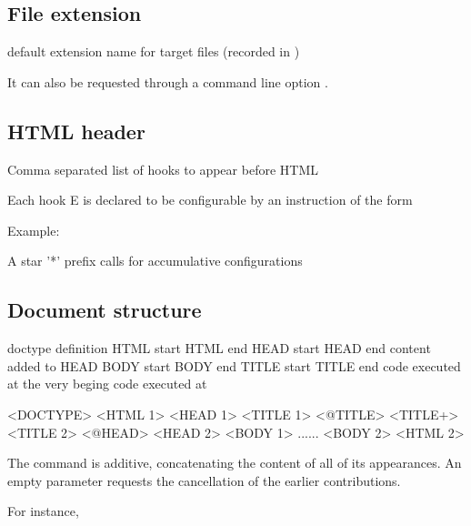 \subsection{File extension}

 {default extension name for target files  (recorded in )}\EndDoc

It can also be requested through a command line option .

\subsection{HTML header}
 {Comma separated list of hooks to appear before HTML}\EndDoc

Each hook E is declared to be configurable by an instruction of the form 


Example:

\begin{texsource}
\end{texsource}

A star '*' prefix calls for accumulative configurations

\subsection{Document structure}


 {doctype definition}\EndDoc
{} {HTML start} {HTML end}\EndDoc
{} {HEAD start} {HEAD end}\EndDoc
{} {content added to HEAD}\EndDoc
{} {BODY start} {BODY end}\EndDoc
{} {TITLE start} {TITLE end}\EndDoc
{} {code executed at the very beging} {code executed at }\EndDoc

\begin{texsource}
<DOCTYPE>
<HTML 1>
  <HEAD 1>
     <TITLE 1>
        <@TITLE>
        <TITLE+>
     <TITLE 2>
     <@HEAD>
  <HEAD 2>
  <BODY 1>
  ......
  <BODY 2>
<HTML 2>
\end{texsource}

The  command is additive, concatenating the
content of all of its appearances.  An empty parameter requests
the cancellation of the earlier contributions.

For instance,

